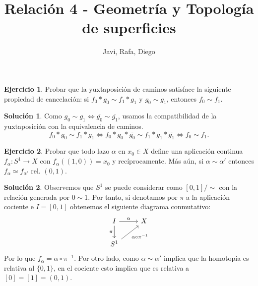 \documentclass{article}
\theoremstyle{plain}
\theoremstyle{definition}
\newtheorem{exercise}{Ejercicio}
\newtheorem*{sol*}{Solución}
\begin{document}
\title{Relación 4 - Geometría y Topología de superficies }
\author{Javi, Rafa, Diego}
\maketitle
\begin{exercise} Probar que la yuxtaposición de caminos satisface la siguiente propiedad de cancelación: si $f_0*g_0 \sim f_1* g_1$ y $g_0 \sim g_1$, entonces $f_0 \sim f_1$.
\end{exercise}
\begin{sol*}
Como $g_0 \sim g_1\Leftrightarrow \overline{g_0}\sim\overline{g_1}$, usamos la compatibilidad de la yuxtaposición con la equivalencia de caminos.
\[
f_0*g_0 \sim f_1* g_1\Leftrightarrow f_0*g_0*\overline{g_0}\sim f_1*g_1*\overline{g_1}\Leftrightarrow f_0\sim f_1.
\]
\end{sol*}

\vspace{0.1cm}

\newpage \begin{exercise} \label{s1}Probar que todo lazo $\alpha$ en $x_0\in X$ define una aplicación continua $f_\alpha: S^1 \to X$ con $f_\alpha((1,0)) = x_0$ y recíprocamente. Más aún, si $\alpha \sim \alpha'$ entonces $f_{\alpha} \simeq f_{\alpha'} \mbox{ rel. } (0,1)$.
\end{exercise}
\begin{sol*}
Observemos que $S^1$ se puede considerar como $[0,1]/\sim$ con la relación generada por $0\sim 1$. Por tanto, si denotamos por $\pi$ a la aplicación cociente e $I=[0,1]$ obtenemos el siguiente diagrama conmutativo:
\[
\begin{tikzcd}
I\arrow[r,"\alpha"]\arrow[d,"\pi"'] & X\\
S^1\arrow[ur,"\alpha\circ\pi^{-1}"']
\end{tikzcd}
\]
Por lo que $f_\alpha=\alpha\circ\pi^{-1}$. Por otro lado, como $\alpha\sim\alpha'$ implica que la homotopía es relativa al $\{0,1\}$, en el cociente esto implica que es relativa a $[0]=[1]=(0,1)$. 
\end{sol*}

\vspace{0.1cm}
\end{document}
